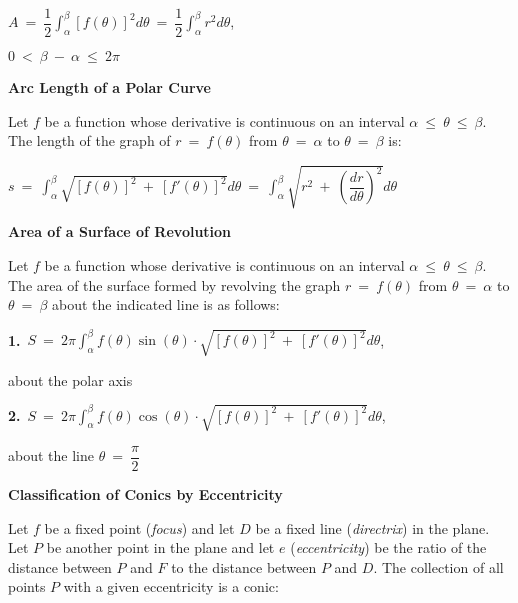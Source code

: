 \documentclass{article}
\begin{document}
\begin{large}
\hspace{1.5in} $A\ =\ \dfrac{1}{2}\displaystyle\int^{\beta}_{\alpha}[f(\theta)]^{2}d\theta\ =\ \dfrac{1}{2}\displaystyle\int^{\beta}_{\alpha}r^{2}d\theta$, \begin{Large} $0\ <\ \beta\ -\ \alpha\ \leq\ 2\pi$ \end{Large}

\textbf{Arc Length of a Polar Curve}

\hspace{0.1in} Let $f$ be a function whose derivative is continuous on an interval $\alpha\ \leq\ \theta\ \leq\ \beta$. The length of the graph of $r\ =\ f(\theta)$ from $\theta\ =\ \alpha$ to $\theta\ =\ \beta$ is:

\hspace{1.5in} $s\ =\ \displaystyle\int^{\beta}_{\alpha}\sqrt{[f(\theta)]^{2}\ +\ [f'(\theta)]^{2}}d\theta\ =\ \displaystyle\int^{\beta}_{\alpha}\sqrt{r^{2}\ +\ \left(\dfrac{dr}{d\theta}\right)^{2}}d\theta$

\textbf{Area of a Surface of Revolution}

\hspace{0.1in} Let $f$ be a function whose derivative is continuous on an interval $\alpha\ \leq\ \theta\ \leq\ \beta$. The area of the surface formed by revolving the graph $r\ =\ f(\theta)$ from $\theta\ =\ \alpha$ to $\theta\ =\ \beta$ about the indicated line is as follows:

\hspace{0.2in} \textbf{1.}\ $S\ =\ 2\pi\displaystyle\int^{\beta}_{\alpha}f(\theta)\sin (\theta)\cdot\sqrt{[f(\theta)]^{2}\ +\ [f'(\theta)]^{2}}d\theta$, \begin{Large} about the polar axis \end{Large}

\hspace{0.2in} \textbf{2.}\ $S\ =\ 2\pi\displaystyle\int^{\beta}_{\alpha}f(\theta)\cos (\theta)\cdot\sqrt{[f(\theta)]^{2}\ +\ [f'(\theta)]^{2}}d\theta$, \begin{Large} about the line $\theta\ =\ \dfrac{\pi}{2}$ \end{Large} 

\textbf{Classification of Conics by Eccentricity}

\hspace{0.1in} Let $f$ be a fixed point (\textit{focus}) and let $D$ be a fixed line (\textit{directrix}) in the plane.  Let $P$ be another point in the plane and let $e$ (\textit{eccentricity}) be the ratio of the distance between $P$ and $F$ to the distance between $P$ and $D$. The collection of all points $P$ with a given eccentricity is a conic:


\end{large}
\end{document}
